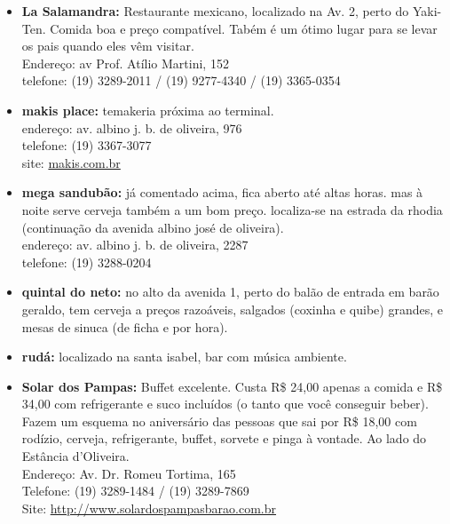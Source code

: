 \begin{itemize}
    \item   \textbf{La Salamandra:} Restaurante mexicano, localizado na Av. 2,
        perto do Yaki-Ten. Comida boa e preço compatível. Tabém é um ótimo lugar
        para se levar os pais quando eles vêm visitar.
        \\Endereço: av Prof. Atílio Martini, 152
        \\telefone: (19) 3289-2011 / (19) 9277-4340 / (19) 3365-0354

    \item   \textbf{makis place:} temakeria próxima ao terminal.
        \\endereço: av. albino j. b. de oliveira, 976
        \\telefone: (19) 3367-3077
        \\site: \url{makis.com.br}

    \item   \textbf{mega sandubão:} já comentado acima, fica aberto até altas
        horas.  mas à noite serve cerveja também a um bom preço. localiza-se na
        estrada da rhodia (continuação da avenida albino josé de oliveira).
        \\endereço: av. albino j. b. de oliveira, 2287
        \\telefone: (19) 3288-0204 

    \item   \textbf{quintal do neto:} no alto da avenida 1, perto do balão de
        entrada em barão geraldo, tem cerveja a preços razoáveis, salgados
        (coxinha e quibe) grandes, e mesas de sinuca (de ficha e por hora).

    \item   \textbf{rudá:} localizado na santa isabel, bar com música ambiente.

    \item   \textbf{Solar dos Pampas:} Buffet excelente. Custa R\$ 24,00 apenas
        a comida e R\$ 34,00 com refrigerante e suco incluídos (o tanto que você
        conseguir beber). Fazem um esquema no aniversário das pessoas que sai
        por R\$ 18,00 com rodízio, cerveja, refrigerante, buffet, sorvete e
        pinga à vontade. Ao lado do Estância d'Oliveira.
        \\Endereço: Av. Dr. Romeu Tortima, 165
        \\Telefone: (19) 3289-1484 / (19) 3289-7869
        \\Site: \url{http://www.solardospampasbarao.com.br}


\end{itemize}
